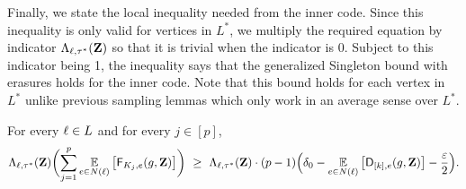 	Finally, we state the local inequality needed from the inner code. Since this inequality is only valid for vertices in $L^*$, we multiply the required equation by indicator $\Lambda_{{ \ell },\tau^*}({ \mathbf{Z} })$ so that it is trivial when the indicator is 0. Subject to this indicator being 1, the inequality says that the generalized Singleton bound with erasures holds for the inner code. Note that this bound holds for each vertex in $L^*$ unlike previous sampling lemmas which only work in an average sense over $L^*$.
	\begin{lemma}\label{lemma:local_avg_singleton}
		For every ${ \ell } \in L$ and for every $j\in [p]$,
		\[
			\Lambda_{\li, \tau^*}(\zee) \parens[\bigg]{ \sum_{j = 1}^p \Ex{e\in N(\li)}{\fd_{K_j, e}(g,\zee)}} ~\geq~ \Lambda_{\li, \tau^*}(\zee) \cdot (p-1) \parens[\Big]{ \delta_0 - \Ex{e\in N(\li)}{\dd_{[k],e}(g,\zee)}  - \frac{\eps}{2}}.
		\]
	\end{lemma}
